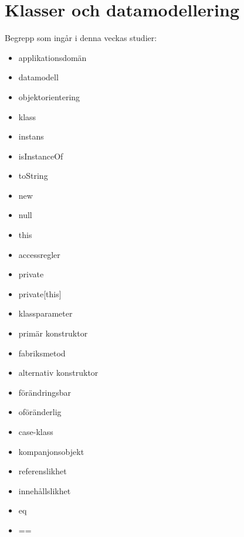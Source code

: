 \chapter{Klasser och datamodellering}\label{chapter:W05}
Begrepp som ingår i denna veckas studier:
\begin{itemize}[noitemsep,label={$\square$},leftmargin=*]
\item applikationsdomän
\item datamodell
\item objektorientering
\item klass
\item instans
\item isInstanceOf
\item toString
\item new
\item null
\item this
\item accessregler
\item private
\item private[this]
\item klassparameter
\item primär konstruktor
\item fabriksmetod
\item alternativ konstruktor
\item förändringsbar
\item oföränderlig
\item case-klass
\item kompanjonsobjekt
\item referenslikhet
\item innehållslikhet
\item eq
\item ==\end{itemize}

